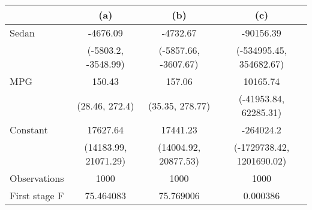 \begin{tabular}{lccc}
\toprule
{} &                   (a) &                   (b) &                        (c) \\
\midrule
Sedan         &              -4676.09 &              -4732.67 &                  -90156.39 \\
              &   (-5803.2, -3548.99) &  (-5857.66, -3607.67) &    (-534995.45, 354682.67) \\
MPG           &                150.43 &                157.06 &                   10165.74 \\
              &        (28.46, 272.4) &       (35.35, 278.77) &      (-41953.84, 62285.31) \\
Constant      &              17627.64 &              17441.23 &                  -264024.2 \\
              &  (14183.99, 21071.29) &  (14004.92, 20877.53) &  (-1729738.42, 1201690.02) \\
Observations  &                  1000 &                  1000 &                       1000 \\
First stage F &             75.464083 &             75.769006 &                   0.000386 \\
\bottomrule
\end{tabular}
